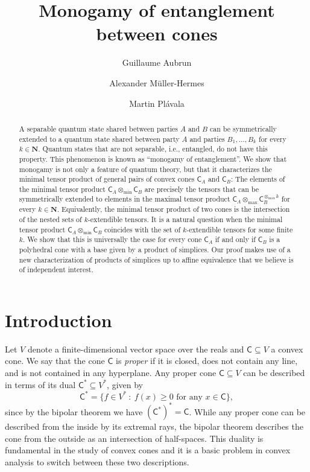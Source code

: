 \documentclass{amsart}
\title{Monogamy of entanglement between cones}
\author{Guillaume Aubrun}
\author{Alexander M\"uller-Hermes}
\author{Martin Pl\'avala}
\renewcommand{\geq}{\geqslant}
\renewcommand{\subset}{\subseteq}
\newcommand{\gC}{\mathsf{C}}
\newcommand{\N}{\mathbf{N}}
\def\lset{\lbrace}
\def\rset{\rbrace}
\theoremstyle{plain}
\begin{document}
\maketitle

\begin{abstract}
    A separable quantum state shared between parties $A$ and $B$ can be symmetrically extended to a quantum state shared between party $A$ and parties $B_1,\ldots ,B_k$ for every $k\in\N$. Quantum states that are not separable, i.e., entangled, do not have this property. This phenomenon is known as ``monogamy of entanglement''. We show that monogamy is not only a feature of quantum theory, but that it characterizes the minimal tensor product of general pairs of convex cones $\gC_A$ and $\gC_B$: The elements of the minimal tensor product $\gC_A\otimes_{\min} \gC_B$ are precisely the tensors that can be symmetrically extended to elements in the maximal tensor product $\gC_A\otimes_{\max} \gC^{\otimes_{\max} k}_B$ for every $k\in\N$. Equivalently, the minimal tensor product of two cones is the intersection of the nested sets of $k$-extendible tensors. It is a natural question when the minimal tensor product $\gC_A\otimes_{\min} \gC_B$ coincides with the set of $k$-extendible tensors for some finite $k$. We show that this is universally the case for every cone $\gC_A$ if and only if $\gC_B$ is a polyhedral cone with a base given by a product of simplices. Our proof makes use of a new characterization of products of simplices up to affine equivalence that we believe is of independent interest.      
\end{abstract}

\section{Introduction}

Let $V$ denote a finite-dimensional vector space over the reals and $\gC\subset V$ a convex cone. We say that the cone $\gC$ is \emph{proper} if it is closed, does not contain any line, and is not contained in any hyperplane. Any proper cone $\gC\subset V$ can be described in terms of its dual $\gC^*\subset V^*$, given by 
\[
\gC^* = \lset f\in V^*~:~f(x)\geq 0 \text{ for any }x\in \gC\rset ,
\]
since by the bipolar theorem we have $(\gC^*)^*=\gC$. While any proper cone can be described from the inside by its extremal rays, the bipolar theorem describes the cone from the outside as an intersection of half-spaces. This duality is fundamental in the study of convex cones and it is a basic problem in convex analysis to switch between these two descriptions.
\end{document}
